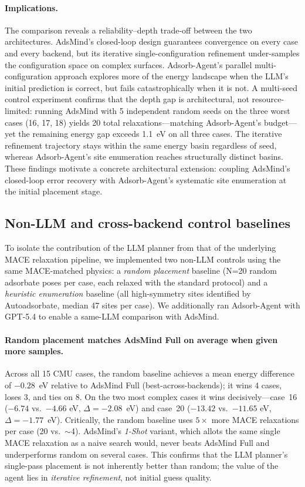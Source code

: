 \paragraph{Implications.}
The comparison reveals a reliability--depth trade-off between the two architectures.
AdsMind's closed-loop design guarantees convergence on every case and every backend, but its iterative single-configuration refinement under-samples the configuration space on complex surfaces.
Adsorb-Agent's parallel multi-configuration approach explores more of the energy landscape when the LLM's initial prediction is correct, but fails catastrophically when it is not.
A multi-seed control experiment confirms that the depth gap is architectural, not resource-limited: running AdsMind with 5 independent random seeds on the three worst cases (16, 17, 18) yields 20 total relaxations---matching Adsorb-Agent's budget---yet the remaining energy gap exceeds 1.1~eV on all three cases.
The iterative refinement trajectory stays within the same energy basin regardless of seed, whereas Adsorb-Agent's site enumeration reaches structurally distinct basins.
These findings motivate a concrete architectural extension: coupling AdsMind's closed-loop error recovery with Adsorb-Agent's systematic site enumeration at the initial placement stage.

\subsection{Non-LLM and cross-backend control baselines}

To isolate the contribution of the LLM planner from that of the underlying MACE relaxation pipeline, we implemented two non-LLM controls using the same MACE-matched physics: a \textit{random placement} baseline (N=20 random adsorbate poses per case, each relaxed with the standard protocol) and a \textit{heuristic enumeration} baseline (all high-symmetry sites identified by Autoadsorbate, median 47 sites per case).
We additionally ran Adsorb-Agent with GPT-5.4 to enable a same-LLM comparison with AdsMind.

\paragraph{Random placement matches AdsMind Full on average when given more samples.}
Across all 15 CMU cases, the random baseline achieves a mean energy difference of $-0.28$~eV relative to AdsMind Full (best-across-backends); it wins 4 cases, loses 3, and ties on 8.
On the two most complex cases it wins decisively---case~16 ($-6.74$ vs.\ $-4.66$ eV, $\Delta = -2.08$~eV) and case~20 ($-13.42$ vs.\ $-11.65$ eV, $\Delta = -1.77$~eV).
Critically, the random baseline uses $5\times$ more MACE relaxations per case (20 vs.\ $\sim$4).
AdsMind's \textit{1-Shot} variant, which allots the same single MACE relaxation as a naive search would, never beats AdsMind Full and underperforms random on several cases.
This confirms that the LLM planner's single-pass placement is not inherently better than random; the value of the agent lies in \textit{iterative refinement}, not initial guess quality.

